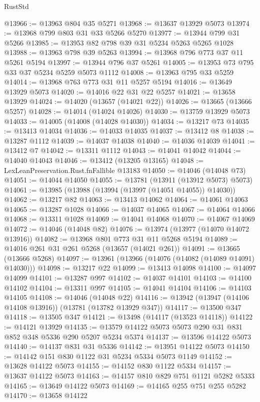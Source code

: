 \begin{lexlean}{RustStd}
\begin{coremodule}
@13966 := @13963 @804 @35 @5271
@13968 := @13637 @13929 @5073
@13974 := @13968 @799 @803 @31 @33 @5266 @5270
@13977 := @13944 @799 @31 @5266
@13985 := @13953 @82 @798 @39 @31 @5234 @5263 @5265 @1028
@13988 := @13963 @798 @39 @5263
@13994 := @13968 @796 @773 @37 @11 @5261 @5194
@13997 := @13944 @796 @37 @5261
@14005 := @13953 @73 @795 @33 @37 @5234 @5259 @5073 @1112
@14008 := @13963 @795 @33 @5259
@14014 := @13968 @763 @773 @31 @11 @5257 @5194
@14016 := @13649 @13929 @5073
@14020 := @14016 @22 @31 @22 @5257
@14021 := @13658 @13929
@14024 := @14020 (@13657 (@14021 @22))
@14026 := @13665 (@13666 @5257)
@14028 := @14014 (@14024 @14026)
@14030 := @13759 @13929 @5073
@14033 := @14005 (@14008 (@14028 @14030))
@14034 := @13217 @73
@14035 := @13413 @14034
@14036 := @14033 @14035
@14037 := @13412 @8
@14038 := @13287 @1112
@14039 := @14037 @14038
@14040 := @14036 @14039
@14041 := @13412 @7
@14042 := @13311 @1112
@14043 := @14041 @14042
@14044 := @14040 @14043
@14046 := @13412 (@13205 @13165)
@14048 := LexLeanPreservation.Rust.fnFallible @13183
@14050 := @14046 (@14048 @73)
@14051 := @14044 @14050
@14055 := @13781 (@13911 (@13912 @5073) @5073)
@14061 := @13985 (@13988 (@13994 (@13997 (@14051 @14055)) @14030))
@14062 := @13217 @82
@14063 := @13413 @14062
@14064 := @14061 @14063
@14065 := @13287 @1028
@14066 := @14037 @14065
@14067 := @14064 @14066
@14068 := @13311 @1028
@14069 := @14041 @14068
@14070 := @14067 @14069
@14072 := @14046 (@14048 @82)
@14076 := @13974 (@13977 (@14070 @14072 @13916))
@14082 := @13968 @801 @773 @31 @11 @5268 @5194
@14089 := @14016 @261 @31 @261 @5268 (@13657 (@14021 @261))
@14091 := @13665 (@13666 @5268)
@14097 := @13961 (@13966 (@14076 (@14082 (@14089 @14091) @14030)))
@14098 := @13217 @22
@14099 := @13413 @14098
@14100 := @14097 @14099
@14101 := @13287 @997
@14102 := @14037 @14101
@14103 := @14100 @14102
@14104 := @13311 @997
@14105 := @14041 @14104
@14106 := @14103 @14105
@14108 := @14046 (@14048 @22)
@14116 := @13942 (@13947 (@14106 @14108 @13916)) (@13781 (@13782 @13929 @347))
@14117 := @13500 @347
@14118 := @13505 @347
@14121 := @13498 (@14117 (@13523 @14118))
@14122 := @14121 @13929
@14135 := @13579 @14122 @5073 @5073 @290 @31 @831 @852 @348 @5336 @290 @5207 @5234 @5374
@14137 := @13596 @14122 @5073
@14140 := @14137 @831 @31 @5336
@14142 := @13951 @14122 @5073
@14150 := @14142 @151 @830 @1122 @31 @5234 @5334 @5073 @1149
@14152 := @13628 @14122 @5073
@14155 := @14152 @830 @1122 @5334
@14157 := @13637 @14122 @5073
@14163 := @14157 @810 @829 @751 @1121 @5282 @5333
@14165 := @13649 @14122 @5073
@14169 := @14165 @255 @751 @255 @5282
@14170 := @13658 @14122

\end{coremodule}
\end{lexlean}
